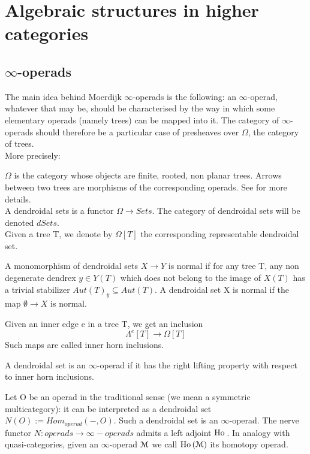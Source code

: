 \chapter{Algebraic structures in higher categories}

\begin{refsection}

\label{weak structures}
\section{$\infty$-operads}
The main idea behind Moerdijk $\infty$-operads is the following: an $\infty$-operad, whatever that may be, should be characterised by the way in which some
elementary operads (namely trees) can be mapped into it. The category of $\infty$-operads should therefore be a particular case of presheaves over $\Omega$,
the category of trees.\\

More precisely:

\begin{definition}
$\Omega$ is the category whose objects are finite, rooted, non planar trees. Arrows between two trees are morphisms of the corresponding operads. See \cite{Mo-We}
for more details.\\
A dendroidal sets is a functor $\Omega\to Sets$. The category of dendroidal sets will be denoted $dSets$.\\
Given a tree T, we denote by $\Omega[T]$ the corresponding representable dendroidal set.
\end{definition}

\begin{definition} \cite{Mo-We}
A monomorphism of dendroidal sets $X\to Y$ is normal if for any tree T, any
non degenerate dendrex $y \in Y (T)$ which does not belong to the image of $X(T )$ has
a trivial stabilizer $Aut(T )_y \subseteq Aut(T )$. A dendroidal set X is normal if the map
$\emptyset\to X$ is normal.
\end{definition}

Given an inner edge
e in a tree T, we get an inclusion
$$\Lambda^e[T]\to \Omega[T]$$
Such maps are called inner horn inclusions.

\begin{definition}
A dendroidal set is an $\infty$-operad if it has the right lifting property with respect to inner horn inclusions.
\end{definition}

\begin{remark}
Let O be an operad in the traditional sense (we mean a symmetric multicategory): it can be interpreted as a dendroidal set $N(O):=Hom_{operad}(-,O)$. Such a
dendroidal set is an $\infty$-operad. The nerve functor $N: operads\to \infty-operads$ admits a left adjoint $\operatorname{\mathrm{Ho} \,}$.
In analogy with quasi-categories, given an $\infty$-operad $\mathcal{M}$ we call $\operatorname{\mathrm{Ho} \,}(\mathcal{M})$ its homotopy operad.


\end{remark}
\end{refsection}
